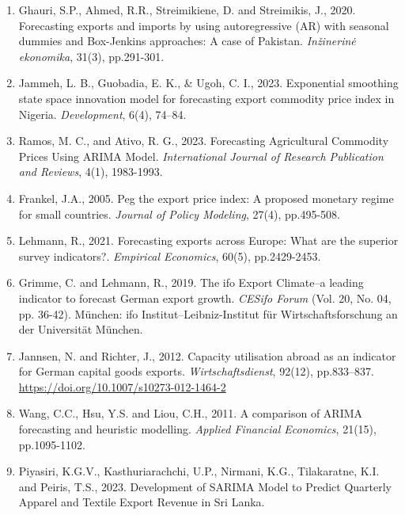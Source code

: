\documentclass[12pt,a4paper]{report} %
\begin{document}
\begin{enumerate}
		\item Ghauri, S.P., Ahmed, R.R., Streimikiene, D. and Streimikis, J., 2020. Forecasting exports
		and imports by using autoregressive (AR) with seasonal dummies and Box-Jenkins
		approaches: A case of Pakistan. \textit{Inžinerinė ekonomika}, 31(3), pp.291-301.
		
		\item Jammeh, L. B., Guobadia, E. K., \& Ugoh, C. I., 2023. Exponential smoothing state space
		innovation model for forecasting export commodity price index in Nigeria. \textit{Development}, 6(4),
		74–84.
		
		\item Ramos, M. C., and Ativo, R. G., 2023. Forecasting Agricultural Commodity Prices Using
		ARIMA Model. \textit{International Journal of Research Publication and Reviews}, 4(1), 1983-1993.
		
		\item Frankel, J.A., 2005. Peg the export price index: A proposed monetary regime for small
		countries. \textit{Journal of Policy Modeling}, 27(4), pp.495-508.
		
		\item Lehmann, R., 2021. Forecasting exports across Europe: What are the superior survey
		indicators?. \textit{Empirical Economics}, 60(5), pp.2429-2453.
		
		\item Grimme, C. and Lehmann, R., 2019. The ifo Export Climate–a leading indicator to
		forecast German export growth. \textit{CESifo Forum} (Vol. 20, No. 04, pp. 36-42). München:
		ifo Institut–Leibniz-Institut für Wirtschaftsforschung an der Universität München.
		
		\item Jannsen, N. and Richter, J., 2012. Capacity utilisation abroad as an indicator for German
		capital goods exports. \textit{Wirtschaftsdienst}, 92(12), pp.833–837.
		\url{https://doi.org/10.1007/s10273-012-1464-2}
		
		\item Wang, C.C., Hsu, Y.S. and Liou, C.H., 2011. A comparison of ARIMA forecasting and
		heuristic modelling. \textit{Applied Financial Economics}, 21(15), pp.1095-1102.
		
		\item Piyasiri, K.G.V., Kasthuriarachchi, U.P., Nirmani, K.G., Tilakaratne, K.I. and Peiris,
		T.S., 2023. Development of SARIMA Model to Predict Quarterly Apparel and Textile
		Export Revenue in Sri Lanka.
		

\end{enumerate}
\end{document}
